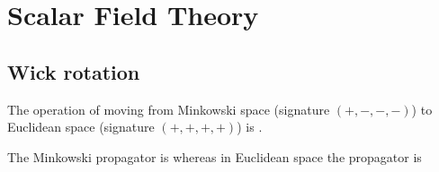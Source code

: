 \documentclass{article}
\begin{document}
\section{Scalar Field Theory}
\subsection{Wick rotation}
The operation of moving from Minkowski space (signature $(+,-,-,-)$) to Euclidean space (signature $(+,+,+,+)$) is . 
\begin{example}
\end{example}
The Minkowski propagator is 
whereas in Euclidean space the propagator is 
\end{document}
